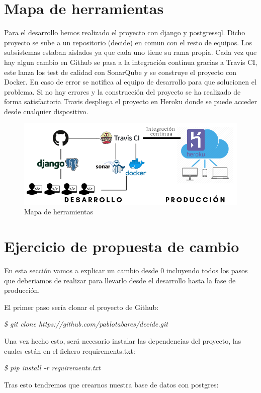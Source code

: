 \documentclass[12pt]{article}
\begin{document}
\section{Mapa de herramientas}

Para el desarrollo hemos realizado el proyecto con django y postgressql. Dicho proyecto se sube a un repositorio (decide) en comun con el resto de equipos. Los subsistemas estaban aislados ya que cada uno tiene su rama propia. Cada vez que hay algun cambio en Github se pasa a la integración continua gracias a Travis CI, este lanza los test de calidad con SonarQube y se construye el proyecto con Docker. En caso de error se notifica al equipo de desarrollo para que solucionen el problema. Si no hay errores y la construcción del proyecto se ha realizado de forma satisfactoria Travis despliega el proyecto en Heroku donde se puede acceder desde cualquier dispositivo.

\begin{figure}[hbt!]
\centering
\includegraphics[width=1\textwidth]{Desarrollo.png}
\caption{Mapa de herramientas}
\end{figure}


\section{Ejercicio de propuesta de cambio}
En esta sección vamos a explicar un cambio desde 0 incluyendo todos los pasos que deberiamos de realizar para llevarlo desde el desarrollo hasta la fase de producción.

El primer paso sería clonar el proyecto de Github:

\emph{\$ git clone 
https://github.com/pablotabares/decide.git}

Una vez hecho esto, será necesario instalar las dependencias del proyecto, las cuales están en el fichero requirements.txt:

\emph{\$ pip install -r requirements.txt}

Tras esto tendremos que crearnos nuestra base de datos con postgres:
\end{document}
